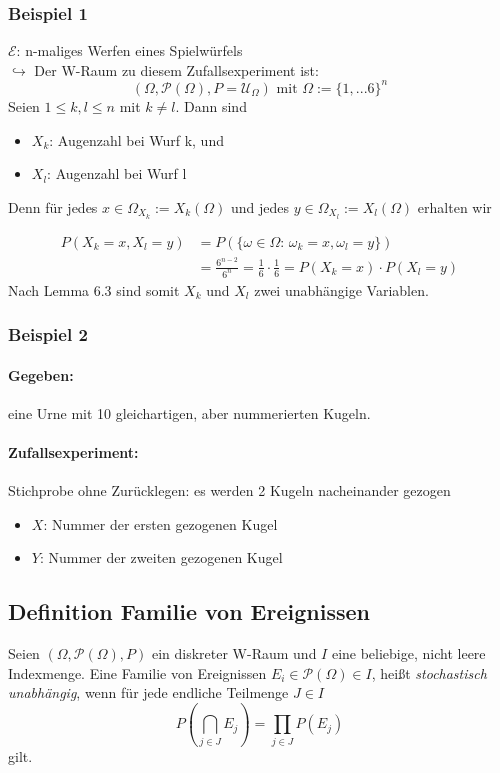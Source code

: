 \documentclass[12pt,a4paper]{article}
\begin{document}
	\subsubsection{Beispiel 1}
	$\mathcal{E}$: n-maliges Werfen eines Spielwürfels\\
	$\hookrightarrow$ Der W-Raum zu diesem Zufallsexperiment ist:
	$$(\Omega,\mathcal{P}(\Omega),P=\mathcal{U}_{\Omega}) \text{ mit } \Omega:=\{1,...6\}^n$$
	Seien $1\leq k , l\leq n$ mit $k\neq l$. Dann sind
	\begin{itemize}
	\item $X_k$: Augenzahl bei Wurf k, und
	\item $X_l$: Augenzahl bei Wurf l
	\end{itemize}			 	
 	Denn für jedes $x\in\Omega_{X_k}:=X_k(\Omega)$ und jedes $y\in\Omega_{X_l}:=X_l(\Omega)$ erhalten wir
 
 	\begin{equation*}
	\begin{split}
	P(X_k =x,X_l = y) & = P(\{\omega\in\Omega:\,\omega_k =x ,\omega_l = y\})\\
	& = \frac{6^{n-2}}{6^n}=\frac{1}{6}\cdot\frac{1}{6}=P(X_k=x)\cdot P(X_l =y)
	\end{split}
	\end{equation*}	 	
 	Nach Lemma 6.3 sind somit $X_k$ und $X_l$ zwei unabhängige Variablen.
 	\subsubsection{Beispiel 2}
 	\paragraph{Gegeben:}  eine Urne mit 10 gleichartigen, aber nummerierten Kugeln.
 	\paragraph{Zufallsexperiment:} Stichprobe ohne Zurücklegen: es werden 2 Kugeln nacheinander gezogen
 	\begin{itemize}
 	\item $X$: Nummer der ersten gezogenen Kugel
 	\item $Y$: Nummer der zweiten gezogenen Kugel
 	\end{itemize}
 	\subsection{Definition Familie von Ereignissen}
 	Seien $(\Omega ,\mathcal{P}(\Omega),P)$ ein diskreter W-Raum und $I$ eine beliebige, nicht leere Indexmenge. Eine Familie von Ereignissen $E_i\in\mathcal{P}(\Omega)\in I$, heißt \textit{stochastisch unabhängig}, wenn für jede endliche Teilmenge $J\in I$
 	$$P\left(\bigcap_{j\in J}E_j\right)=\prod_{j\in J}P(E_j)$$
 	gilt.
\end{document}
